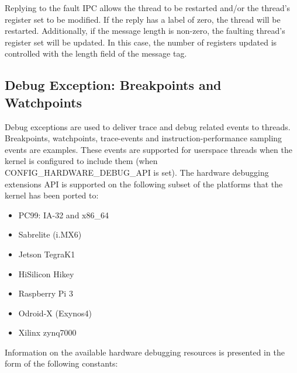 Replying to the fault IPC allows the thread to be restarted
and/or the thread's register set to be modified. If the reply has
a label of zero, the thread will be restarted. Additionally, if the
message length is non-zero, the faulting thread's register set will be
updated. In this case, the number of
registers updated is controlled with the length field of the message
tag.

\subsection{Debug Exception: Breakpoints and Watchpoints}
\label{sec:debug_exceptions}

Debug exceptions are used to deliver trace and debug related events to threads.
Breakpoints, watchpoints, trace-events and instruction-performance sampling
events are examples. These events are supported for userspace threads when the kernel
is configured to include them (when CONFIG\_HARDWARE\_DEBUG\_API is set). The hardware
debugging extensions API is supported on the following subset of the platforms that the
kernel has been ported to:

\begin{itemize}
\item PC99: IA-32 and x86\_64
\item Sabrelite (i.MX6)
\item Jetson TegraK1
\item HiSilicon Hikey
\item Raspberry Pi 3
\item Odroid-X (Exynos4)
\item Xilinx zynq7000
\end{itemize}

Information on the available hardware debugging resources is presented in the form of the following constants:

